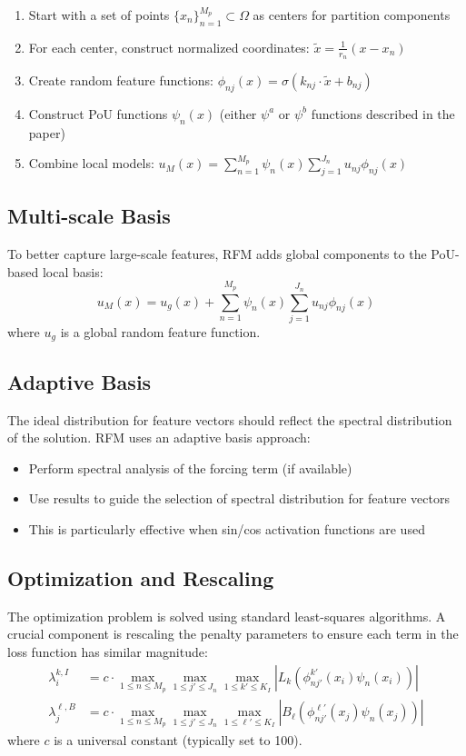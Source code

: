 \documentclass[11pt]{article}
\begin{document}
\begin{enumerate}
    \item Start with a set of points $\{x_n\}_{n=1}^{M_p} \subset \Omega$ as centers for partition components
    \item For each center, construct normalized coordinates: $\tilde{x} = \frac{1}{r_n}(x-x_n)$
    \item Create random feature functions: $\phi_{nj}(x) = \sigma(k_{nj} \cdot \tilde{x} + b_{nj})$
    \item Construct PoU functions $\psi_n(x)$ (either $\psi^a$ or $\psi^b$ functions described in the paper)
    \item Combine local models: $u_M(x) = \sum_{n=1}^{M_p} \psi_n(x) \sum_{j=1}^{J_n} u_{nj} \phi_{nj}(x)$
\end{enumerate}

\subsection{Multi-scale Basis}
To better capture large-scale features, RFM adds global components to the PoU-based local basis:
\begin{equation}
u_M(x) = u_g(x) + \sum_{n=1}^{M_p} \psi_n(x) \sum_{j=1}^{J_n} u_{nj} \phi_{nj}(x)
\end{equation}
where $u_g$ is a global random feature function.

\subsection{Adaptive Basis}
The ideal distribution for feature vectors should reflect the spectral distribution of the solution. RFM uses an adaptive basis approach:
\begin{itemize}
    \item Perform spectral analysis of the forcing term (if available)
    \item Use results to guide the selection of spectral distribution for feature vectors
    \item This is particularly effective when sin/cos activation functions are used
\end{itemize}

\subsection{Optimization and Rescaling}
The optimization problem is solved using standard least-squares algorithms. A crucial component is rescaling the penalty parameters to ensure each term in the loss function has similar magnitude:
\begin{align}
\lambda_i^{k,I} &= c \cdot \max_{1 \leq n \leq M_p} \max_{1 \leq j' \leq J_n} \max_{1 \leq k' \leq K_I} |L_k(\phi_{nj'}^{k'}(x_i)\psi_n(x_i))| \\
\lambda_j^{\ell,B} &= c \cdot \max_{1 \leq n \leq M_p} \max_{1 \leq j' \leq J_n} \max_{1 \leq \ell' \leq K_I} |B_\ell(\phi_{nj'}^{\ell'}(x_j)\psi_n(x_j))|
\end{align}
where $c$ is a universal constant (typically set to 100).
\end{document}
